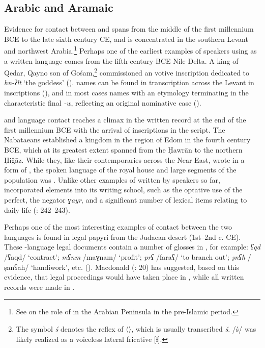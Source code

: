 \documentclass[output=paper]{langsci/langscibook}
\begin{document}
\subsection{Arabic and Aramaic}
Evidence for contact between  and  spans from the middle of the first millennium BCE to the late sixth century CE, and is concentrated in the southern Levant and northwest Arabia.\footnote{See \citet{Stein2018} on the role of  in the Arabian Peninsula in the pre-Islamic period.} Perhaps one of the earliest examples of  speakers using  as a written language comes from the fifth-century-BCE Nile Delta. A king of Qedar, Qayno  son of Gośam,\footnote{The symbol \textit{ś} denotes the   reflex of   〈〉, which is usually transcribed \textit{š}. /ś/ was likely realized as a voiceless lateral fricative [ɬ].} commissioned an  votive inscription dedicated to \textit{hn-ʔlt} ‘the goddess’ (\citealt{Rabinowitz1956}).  names can be found in transcription across the Levant in  inscriptions (\citealt{Israel1995}), and in most cases names with an  etymology terminating in the characteristic final \textit{-w}, reflecting an original nominative case (\citealt{Al-Jalladforthcoming}). 

 and  language contact reaches a climax in the written record at the end of the first millennium BCE with the arrival of inscriptions in the  script. The Nabataeans established a kingdom in the region of Edom in the fourth century BCE, which at its greatest extent spanned from the Ḥawrān to the northern Ḥiǧāz. While they, like their contemporaries across the Near East, wrote in a form of  , the spoken language of the royal house and large segments of the population was . Unlike other examples of  written by  speakers so far,  incorporated  elements into its writing school, such as the optative use of the perfect, the negator \textit{ɣayr}, and a significant number of lexical items relating to daily life (\citealt{Gzella2015}: 242--243).

Perhaps one of the most interesting examples of contact between the two languages is found in  legal papyri from the Judaean desert (1st--2nd c. CE). These -language legal documents contain a number of glosses in , for example: \textit{ʕqd} /ʕaqd/ ‘contract’; \textit{mʕnm} /maɣnam/ ‘profit’; \textit{prʕ} /faraʕ/ ‘to branch out’; \textit{ṣnʕh} /ṣanʕah/ ‘handiwork’, etc. (\citealt{Yardeni2014}). Macdonald (\citeyear{Macdonald2010}: 20) has suggested, based on this evidence, that  legal proceedings would have taken place in , while all written records were made in .
\end{document}
